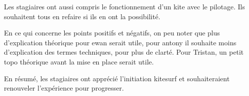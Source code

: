 \documentclass[12pt,a4paper]{report}
\begin{document}
Les stagiaires ont aussi compris le fonctionnement d'un kite avec le pilotage.
Ils souhaitent tous en refaire si ils en ont la possibilité.

En ce qui concerne les points positifs et négatifs, on peu noter
que plus d'explication théorique pour ewan serait utile, pour antony
il souhaite moins d'explication des termes techniques, pour plus de clarté.
Pour Tristan, un petit topo théorique avant la mise en place serait utile.

En résumé, les stagiaires ont apprécié l'initiation kitesurf et
souhaiteraient renouveler l'expérience pour progresser.
\end{document}
